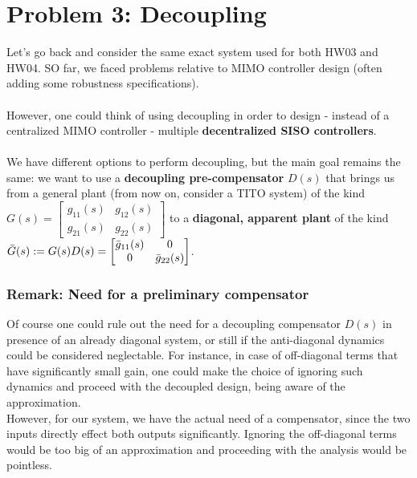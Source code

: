 \documentclass[a4paper, 12pt]{article}
\begin{document}
\section{Problem 3: Decoupling}
Let's go back and consider the same exact system used for both HW03 and HW04. SO far, we faced problems relative to MIMO controller design (often adding some robustness specifications). 
\\\\However, one could think of using decoupling in order to design - instead of a centralized MIMO controller - multiple \textbf{decentralized SISO controllers}.
\\\\
We have different options to perform decoupling, but the main goal remains the same: we want to use a \textbf{decoupling pre-compensator} $D(s)$ that brings us from a general plant (from now on, consider a TITO system) of the kind
$G(s) = \begin{bmatrix}
g_{11}(s) & g_{12}(s)\\
g_{21}(s) & g_{22}(s)
\end{bmatrix}$
to a \textbf{diagonal, apparent plant} of the kind \\
$\Bar{G}(s) := G(s)D(s) = \begin{bmatrix}
\Bar{g}_{11}(s) & 0\\
0 & \Bar{g}_{22}(s)
\end{bmatrix}$.

\subsubsection*{Remark: Need for a preliminary compensator}
Of course one could rule out the need for a decoupling compensator $D(s)$ in presence of an already diagonal system, or still if the anti-diagonal dynamics could be considered neglectable. For instance, in case of off-diagonal terms that have significantly small gain, one could make the choice of ignoring such dynamics and proceed with the decoupled design, being aware of the approximation.
\\
However, for our system, we have the actual need of a compensator, since the two inputs directly effect both outputs significantly. Ignoring the off-diagonal terms would be too big of an approximation and proceeding with the analysis would be pointless.
\end{document}
